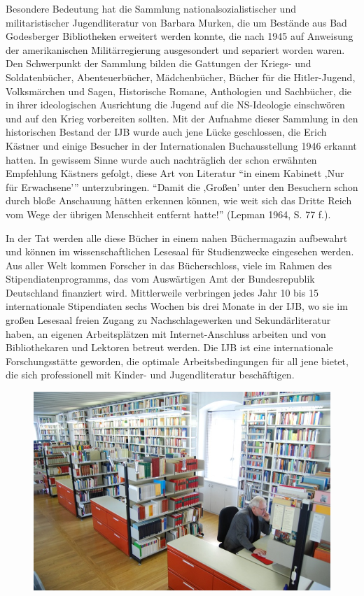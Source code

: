 \documentclass[a4paper,
fontsize=11pt,
oneside,
numbers=noperiodatend,
parskip=half-,
bibliography=totoc,
final
]{scrartcl}
\begin{document}
Besondere Bedeutung hat die Sammlung nationalsozialistischer und
militaristischer Jugendliteratur von Barbara Murken, die um Bestände aus
Bad Godesberger Bibliotheken erweitert werden konnte, die nach 1945 auf
Anweisung der amerikanischen Militärregierung ausgesondert und separiert
worden waren. Den Schwerpunkt der Sammlung bilden die Gattungen der
Kriegs- und Soldatenbücher, Abenteuerbücher, Mädchenbücher, Bücher für
die Hitler-Jugend, Volksmärchen und Sagen, Historische Romane,
Anthologien und Sachbücher, die in ihrer ideologischen Ausrichtung die
Jugend auf die NS-Ideologie einschwören und auf den Krieg vorbereiten
sollten. Mit der Aufnahme dieser Sammlung in den historischen Bestand
der IJB wurde auch jene Lücke geschlossen, die Erich Kästner und einige
Besucher in der Internationalen Buchausstellung 1946 erkannt hatten. In
gewissem Sinne wurde auch nachträglich der schon erwähnten Empfehlung
Kästners gefolgt, diese Art von Literatur \enquote{in einem Kabinett
‚Nur für Erwachsene'} unterzubringen. \enquote{Damit die ‚Großen' unter
den Besuchern schon durch bloße Anschauung hätten erkennen können, wie
weit sich das Dritte Reich vom Wege der übrigen Menschheit entfernt
hatte!} (Lepman 1964, S. 77 f.).~

In der Tat werden alle diese Bücher in einem nahen Büchermagazin
aufbewahrt und können im wissenschaftlichen Lesesaal für Studienzwecke
eingesehen werden. Aus aller Welt kommen Forscher in das Bücherschloss,
viele im Rahmen des Stipendiatenprogramms, das vom Auswärtigen Amt der
Bundesrepublik Deutschland finanziert wird. Mittlerweile verbringen
jedes Jahr 10 bis 15 internationale Stipendiaten sechs Wochen bis drei
Monate in der IJB, wo sie im großen Lesesaal freien Zugang zu
Nachschlagewerken und Sekundärliteratur haben, an eigenen Arbeitsplätzen
mit Internet-Anschluss arbeiten und von Bibliothekaren und Lektoren
betreut werden. Die IJB ist eine internationale Forschungsstätte
geworden, die optimale Arbeitsbedingungen für all jene bietet, die sich
professionell mit Kinder- und Jugendliteratur beschäftigen.~

\begin{figure}[htbp]
\centering
\includegraphics{img/bild17.jpg}
\end{figure}
\end{document}
